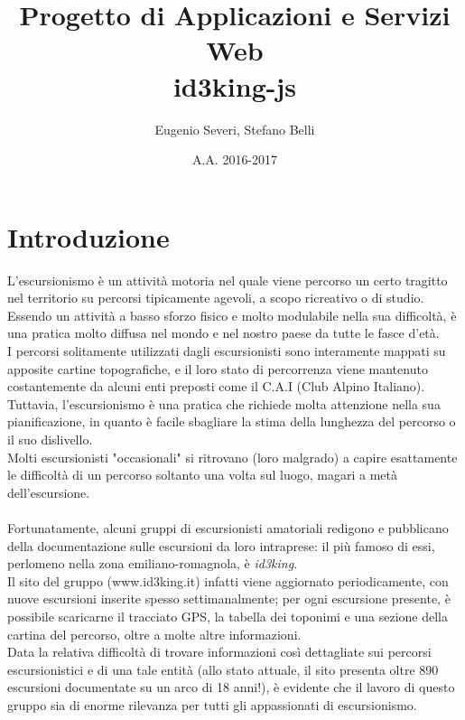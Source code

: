 \documentclass[11pt]{report}
\begin{document}
\title{Progetto di Applicazioni e Servizi Web\\id3king-js}
\author{Eugenio Severi, Stefano Belli}
\date{A.A. 2016-2017}
\begin{titlepage}
	\maketitle
\end{titlepage}

\setcounter{chapter}{1}
\section{Introduzione}
L'escursionismo è un attività motoria nel quale viene percorso un certo tragitto nel territorio su percorsi tipicamente agevoli, a scopo ricreativo o di studio.
\\Essendo un attività a basso sforzo fisico e molto modulabile nella sua difficoltà, è una pratica molto diffusa nel mondo e nel nostro paese da tutte le fasce d'età.\\ 
I percorsi solitamente utilizzati dagli escursionisti sono interamente mappati su apposite cartine topografiche, e il loro stato di percorrenza viene mantenuto costantemente da alcuni enti preposti come il C.A.I (Club Alpino Italiano).
\\Tuttavia, l'escursionismo è una pratica che richiede molta attenzione nella sua pianificazione, in quanto è facile sbagliare la stima della lunghezza del percorso o il suo dislivello. 
\\Molti escursionisti "occasionali" si ritrovano (loro malgrado) a capire esattamente le difficoltà di un percorso soltanto una volta sul luogo, magari a metà dell'escursione.
\\\\Fortunatamente, alcuni gruppi di escursionisti amatoriali redigono e pubblicano della documentazione sulle escursioni da loro intraprese: il più famoso di essi, perlomeno nella zona emiliano-romagnola, è \textit{id3king}.
\\Il sito del gruppo (www.id3king.it) infatti viene aggiornato periodicamente, con nuove escursioni inserite spesso settimanalmente; per ogni escursione presente, è possibile scaricarne il tracciato GPS, la tabella dei toponimi e una sezione della cartina del percorso, oltre a molte altre informazioni.
\\Data la relativa difficoltà di trovare informazioni così dettagliate sui percorsi escursionistici e di una tale entità (allo stato attuale, il sito presenta oltre 890 escursioni documentate su un arco di 18 anni!), è evidente che il lavoro di questo gruppo sia di enorme rilevanza per tutti gli appassionati di escursionismo.
\end{document}
